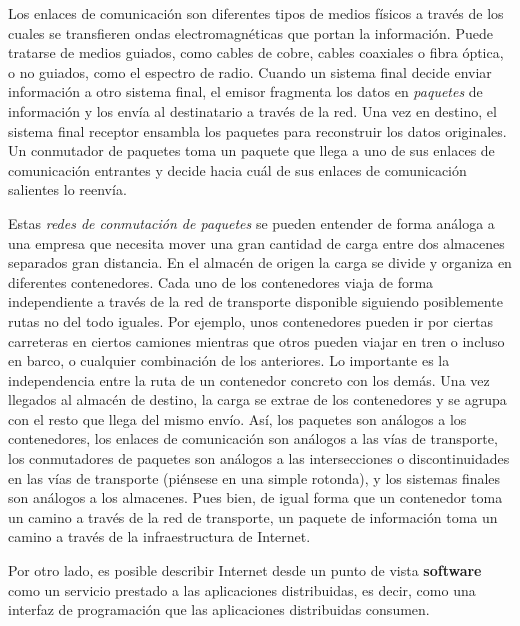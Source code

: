 \documentclass[a4paper,12pt,twoside,openright]{report}
\begin{document}
    Los enlaces de comunicación son diferentes tipos de medios físicos a través de los cuales se transfieren ondas electromagnéticas que portan la información. Puede tratarse de medios guiados, como cables de cobre, cables coaxiales o fibra óptica, o no guiados, como el espectro de radio. Cuando un sistema final decide enviar información a otro sistema final, el emisor fragmenta los datos en \emph{paquetes} de información y los envía al destinatario a través de la red. Una vez en destino, el sistema final receptor ensambla los paquetes para reconstruir los datos originales. Un conmutador de paquetes toma un paquete que llega a uno de sus enlaces de comunicación entrantes y decide hacia cuál de sus enlaces de comunicación salientes lo reenvía.
    
    Estas \emph{redes de conmutación de paquetes} se pueden entender de forma análoga a una empresa que necesita mover una gran cantidad de carga entre dos almacenes separados gran distancia. En el almacén de origen la carga se divide y organiza en diferentes contenedores. Cada uno de los contenedores viaja de forma independiente a través de la red de transporte disponible siguiendo posiblemente rutas no del todo iguales. Por ejemplo, unos contenedores pueden ir por ciertas carreteras en ciertos camiones mientras que otros pueden viajar en tren o incluso en barco, o cualquier combinación de los anteriores. Lo importante es la independencia entre la ruta de un contenedor concreto con los demás. Una vez llegados al almacén de destino, la carga se extrae de los contenedores y se agrupa con el resto que llega del mismo envío. Así, los paquetes son análogos a los contenedores, los enlaces de comunicación son análogos a las vías de transporte, los conmutadores de paquetes son análogos a las intersecciones o discontinuidades en las vías de transporte (piénsese en una simple rotonda), y los sistemas finales son análogos a los almacenes. Pues bien, de igual forma que un contenedor toma un camino a través de la red de transporte, un paquete de información toma un camino a través de la infraestructura de Internet.
    
    Por otro lado, es posible describir Internet desde un punto de vista \textbf{software} como un servicio prestado a las aplicaciones distribuidas, es decir, como una interfaz de programación que las aplicaciones distribuidas consumen.
    
\end{document}
